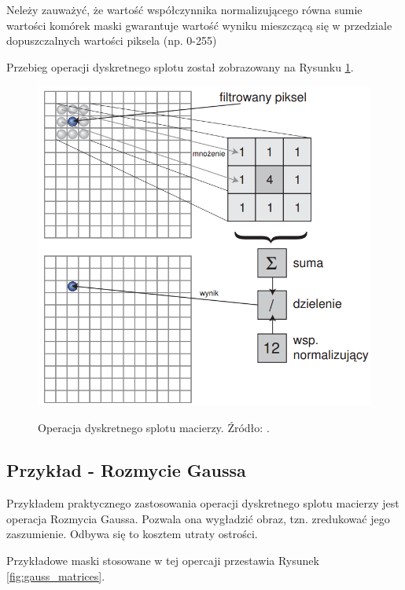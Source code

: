 \documentclass[a4paper,twocolumn,12pt]{article}
\begin{document}
Neleży zauważyć, że wartość współczynnika normalizującego równa sumie wartości komórek maski gwarantuje wartość wyniku mieszczącą się w przedziale dopuszczalnych wartości piksela (np. 0-255)

Przebieg operacji dyskretnego splotu został zobrazowany na Rysunku \ref{fig:convolution}.

\begin{figure}[!ht]
 \begin{center}
  \scalebox{0.25}
  {
   \includegraphics{../obrazki/filtry/splot.png}
  }
 \end{center}
 \caption{
  Operacja dyskretnego splotu macierzy.
  Źródło: \cite{stec}.
 }
 \label{fig:convolution}
\end{figure}


\subsection{Przykład - Rozmycie Gaussa}

Przykładem praktycznego zastosowania operacji dyskretnego splotu macierzy jest operacja Rozmycia Gaussa.
Pozwala ona wygładzić obraz, tzn. zredukować jego zaszumienie.
Odbywa się to kosztem utraty ostrości.

Przykładowe maski stosowane w tej opercaji przestawia Rysunek \ref{fig:gauss_matrices}.
\end{document}
